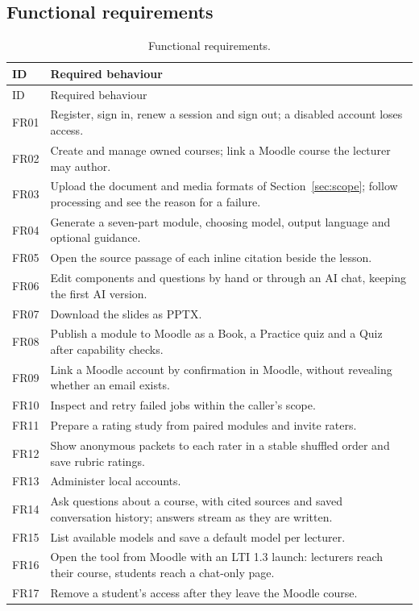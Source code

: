 \subsection{Functional requirements}
\begin{longtable}{|p{1.3cm}|p{13.6cm}|}
\caption{Functional requirements.}\label{tab:requirements}\\\hline
ID & Required behaviour\\\hline\endfirsthead
\hline ID & Required behaviour\\\hline\endhead
FR01 & Register, sign in, renew a session and sign out; a disabled account loses access.\\\hline
FR02 & Create and manage owned courses; link a Moodle course the lecturer may author.\\\hline
FR03 & Upload the document and media formats of Section~\ref{sec:scope}; follow processing and see the reason for a failure.\\\hline
FR04 & Generate a seven-part module, choosing model, output language and optional guidance.\\\hline
FR05 & Open the source passage of each inline citation beside the lesson.\\\hline
FR06 & Edit components and questions by hand or through an AI chat, keeping the first AI version.\\\hline
FR07 & Download the slides as PPTX.\\\hline
FR08 & Publish a module to Moodle as a Book, a Practice quiz and a Quiz after capability checks.\\\hline
FR09 & Link a Moodle account by confirmation in Moodle, without revealing whether an email exists.\\\hline
FR10 & Inspect and retry failed jobs within the caller's scope.\\\hline
FR11 & Prepare a rating study from paired modules and invite raters.\\\hline
FR12 & Show anonymous packets to each rater in a stable shuffled order and save rubric ratings.\\\hline
FR13 & Administer local accounts.\\\hline
FR14 & Ask questions about a course, with cited sources and saved conversation history; answers stream as they are written.\\\hline
FR15 & List available models and save a default model per lecturer.\\\hline
FR16 & Open the tool from Moodle with an LTI 1.3 launch: lecturers reach their course, students reach a chat-only page.\\\hline
FR17 & Remove a student's access after they leave the Moodle course.\\\hline
\end{longtable}
